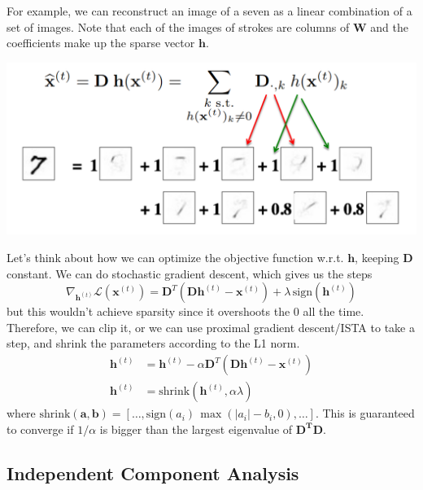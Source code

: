   For example, we can reconstruct an image of a seven as a linear combination of a set of images. Note that each of the images of strokes are columns of $\mathbf{W}$ and the coefficients make up the sparse vector $\mathbf{h}$. 
  \begin{center}
    \includegraphics[scale=0.4]{img/sparse_coding.png}
  \end{center}
  Let's think about how we can optimize the objective function w.r.t. $\mathbf{h}$, keeping $\mathbf{D}$ constant. We can do stochastic gradient descent, which gives us the steps
  \begin{equation}
    \nabla_{\mathbf{h}^{(t)}} \mathcal{L}(\mathbf{x}^{(t)}) = \mathbf{D}^T (\mathbf{D} \mathbf{h}^{(t)} - \mathbf{x}^{(t)}) + \lambda \, \mathrm{sign}(\mathbf{h}^{(t)})
  \end{equation}
  but this wouldn't achieve sparsity since it overshoots the $0$ all the time. Therefore, we can clip it, or we can use proximal gradient descent/ISTA to take a step, and shrink the parameters according to the L1 norm. 
  \begin{align} 
    \mathbf{h}^{(t)} & = \mathbf{h}^{(t)} - \alpha \mathbf{D}^T (\mathbf{D} \mathbf{h}^{(t)} - \mathbf{x}^{(t)}) \\
    \mathbf{h}^{(t)} & = \mathrm{shrink}(\mathbf{h}^{(t)}, \alpha \lambda)
  \end{align}
  where $\mathrm{shrink}(\mathbf{a}, \mathbf{b}) = [\ldots, \mathrm{sign}(a_i)\, \max(|a_i| - b_i, 0), \ldots]$. This is guaranteed to converge if $1/\alpha$ is bigger than the largest eigenvalue of $\mathbf{D^T} \mathbf{D}$.  
  
\subsection{Independent Component Analysis} 

